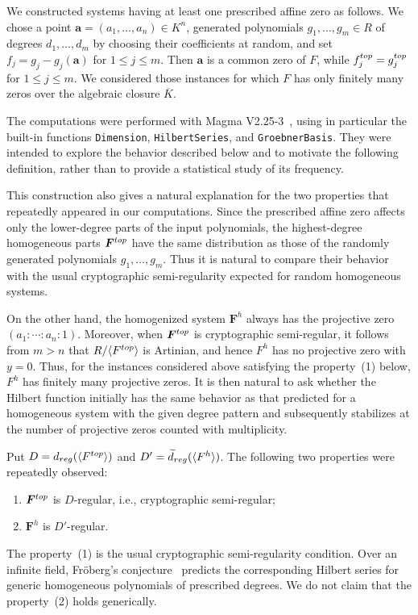 \documentclass{article}
\theoremstyle{definition}
\theoremstyle{plain}
\theoremstyle{plain}
\theoremstyle{plain}
\theoremstyle{plain}
\numberwithin{equation}{subsection}
\begin{document}
We constructed systems having at least one prescribed affine zero as follows.
We chose a point $\bm a=(a_1,\ldots,a_n)\in K^n$, generated polynomials $g_1,\ldots,g_m\in R$ of degrees $d_1,\ldots,d_m$ by choosing their coefficients at random, and set $f_j=g_j-g_j(\bm a)$ for $1\leq j\leq m$.
Then $\bm a$ is a common zero of $F$, while $f_j^{\rm top}=g_j^{\rm top}$ for $1\leq j \leq m$.
We considered those instances for which $F$ has only finitely many zeros over the algebraic closure $\overline K$.

The computations were performed with Magma V2.25-3~\cite{MagmaBCP}, using in particular the built-in functions \texttt{Dimension}, \texttt{HilbertSeries}, and \texttt{GroebnerBasis}.
They were intended to explore the behavior described below and to motivate the following definition, rather than to provide a statistical study of its frequency.

This construction also gives a natural explanation for the two properties that repeatedly appeared in our computations.
Since the prescribed affine zero affects only the lower-degree parts of the input polynomials, the highest-degree homogeneous parts $\bm F^{\rm top}$ have the same distribution as those of the randomly generated polynomials $g_1,\ldots,g_m$.
Thus it is natural to compare their behavior with the usual cryptographic semi-regularity expected for random homogeneous systems.

On the other hand, the homogenized system $\bm F^h$ always has the projective zero $(a_1:\cdots:a_n:1)$.
Moreover, when $\bm F^{\rm top}$ is cryptographic semi-regular, it follows from $m>n$ that $R/\langle F^{\rm top}\rangle$ is Artinian, and hence $F^h$ has no projective zero with $y=0$.
Thus, for the instances considered above satisfying the property~{\rm (1)} below, $F^h$ has finitely many projective zeros.
It is then natural to ask whether the Hilbert function initially has the same behavior as that predicted for a homogeneous system with the given degree pattern and subsequently stabilizes at the number of projective zeros counted with multiplicity.

Put $D=d_{\rm reg}(\langle F^{\rm top}\rangle)$ and $D'=\widetilde d_{\rm reg}(\langle F^h\rangle)$.
The following two properties were repeatedly observed:
\begin{enumerate}
\item[(1)] $\bm{F}^{\rm top}$ is $D$-regular, i.e., cryptographic semi-regular;
\item[(2)] $\bm F^h$ is $D'$-regular.
\end{enumerate}
The property~{\rm (1)} is the usual cryptographic semi-regularity condition.
Over an infinite field, Fr\"oberg's conjecture~\cite{Froberg} predicts the corresponding Hilbert series for generic homogeneous polynomials of prescribed degrees.
We do not claim that the property~{\rm (2)} holds generically.
\end{document}
